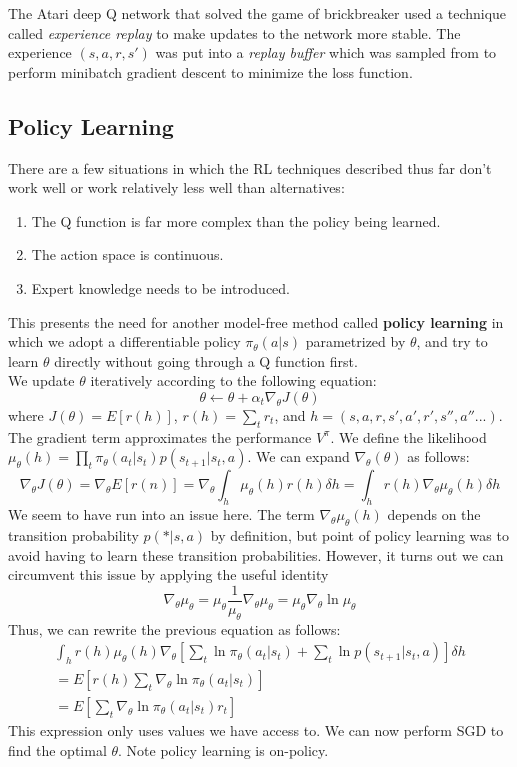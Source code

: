 The Atari deep Q network that solved the game of brickbreaker used a technique called \textit{experience replay} to make updates to the network more stable. The experience $(s, a, r, s')$ was put into a \textit{replay buffer} which was sampled from to perform minibatch gradient descent to minimize the loss function.
\subsection{Policy Learning}
There are a few situations in which the RL techniques described thus far don't work well or work relatively less well than alternatives:
\begin{enumerate}
    \item The Q function is far more complex than the policy being learned.
    \item The action space is continuous.
    \item Expert knowledge needs to be introduced.
\end{enumerate}
This presents the need for another model-free method called \textbf{policy learning} in which we adopt a differentiable policy $\pi_\theta(a|s)$ parametrized by $\theta$, and try to learn $\theta$ directly without going through a Q function first.\\
We update $\theta$ iteratively according to the following equation:
\begin{equation*}
    \theta \leftarrow \theta + \alpha_t \nabla_\theta J(\theta)
\end{equation*}
where $J(\theta) = E[r(h)]$, $r(h) = \sum_tr_t$, and $h = (s, a, r, s', a', r', s'', a''...)$. The gradient term approximates the performance $V^{\pi}$. We define the likelihood $\mu_\theta(h) = \prod_t\pi_\theta(a_t|s_t)p(s_{t+1}|s_t, a)$. We can expand $\nabla_\theta(\theta)$ as follows:
\begin{equation}
    \nabla_\theta J(\theta) = \nabla_\theta E[r(n)] = \nabla_\theta\int_h\mu_\theta(h)r(h)\delta h = \int_hr(h)\nabla_\theta\mu_\theta(h)\delta h
\end{equation}
We seem to have run into an issue here. The term $\nabla_\theta\mu_\theta(h)$ depends on the transition probability $p(*|s, a)$ by definition, but point of policy learning was to avoid having to learn these transition probabilities. However, it turns out we can circumvent this issue by applying the useful identity
\begin{equation}
    \nabla_\theta\mu_\theta = \mu_\theta\frac{1}{\mu_\theta}\nabla_\theta\mu_\theta = \mu_\theta\nabla_\theta\ln\mu_\theta
\end{equation}
Thus, we can rewrite the previous equation as follows:
\begin{align}
    \int_hr(h)\mu_\theta(h)\nabla_\theta\left[\sum_t\ln\pi_\theta(a_t|s_t) + \sum_t\ln p(s_{t+1}|s_t, a)\right]\delta h\\
    = E\left[r(h)\sum_t\nabla_\theta\ln\pi_\theta(a_t|s_t)\right]\\
    = E\left[\sum_t\nabla_\theta\ln\pi_\theta(a_t|s_t)r_t\right]
\end{align}
This expression only uses values we have access to. We can now perform SGD to find the optimal $\theta$. Note policy learning is on-policy.
